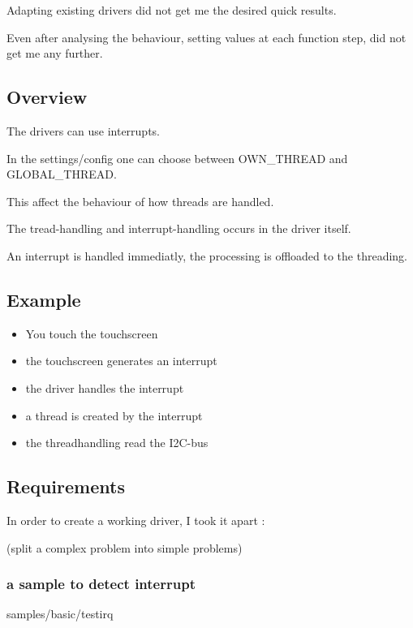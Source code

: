 \documentclass[letterpaper,10pt,english]{sphinxmanual}
\begin{document}
Adapting existing drivers did not get me the desired quick results.

Even after analysing the behaviour, setting values at each function step, did not get me any further.


\subsection{Overview}
\label{\detokenize{behind/troubleshoot:overview}}
The drivers can use interrupts.

In the settings/config one can choose between OWN\_THREAD and GLOBAL\_THREAD.

This affect the behaviour of how threads are handled.

The tread-handling and interrupt-handling occurs in the driver itself.

An interrupt is handled immediatly, the processing is offloaded to the threading.


\subsection{Example}
\label{\detokenize{behind/troubleshoot:example}}\begin{itemize}
\item {} 
You touch the touchscreen

\item {} 
the touchscreen generates an interrupt

\item {} 
the driver handles the interrupt

\item {} 
a thread is created by the interrupt

\item {} 
the threadhandling read the I2C-bus

\end{itemize}


\subsection{Requirements}
\label{\detokenize{behind/troubleshoot:requirements}}
In order to create a working driver, I took it apart :

(split a complex problem into simple problems)


\subsubsection{a sample to detect interrupt}
\label{\detokenize{behind/troubleshoot:a-sample-to-detect-interrupt}}
samples/basic/testirq
\end{document}
